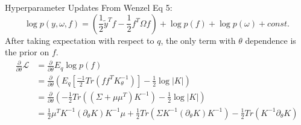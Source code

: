 \documentclass[aspectratio=169,xcolor=dvipsnames]{beamer}
\begin{document}
\begin{frame}{Hyperparameter Updates}
    From Wenzel Eq 5:
    $$ \log p(y, \omega, f) = \left(\frac{1}{2}\tilde{y}^T f - \frac{1}{2} f^T \Omega f\right) + \log p(f) + \log p(\omega) + const.$$
After taking expectation with respect to $q$, the only term with $\theta$ dependence is the prior on $f$. 
\begin{align} 
\frac{\partial}{\partial \theta} \mathcal L &= \frac{\partial}{\partial \theta} E_q \log p(f)  \\
& =\frac{\partial}{\partial \theta} \left(E_q\left[ \frac{-1}{2}Tr(ff^T K_\theta^{-1}) \right] - \frac{1}{2} \log |K|\right)\\
& = \frac{\partial}{\partial \theta}\left(-\frac{1}{2} Tr\left((\Sigma + \mu \mu^T)K^{-1}\right) - \frac{1}{2} \log |K|\right)\\
& = \frac{1}{2} \mu^T K^{-1} (\partial_\theta K) K^{-1} \mu + \frac{1}{2}Tr(\Sigma K^{-1} (\partial_\theta K)K^{-1}) - \frac{1}{2} Tr(K^{-1} \partial_\theta K)
\end{align}

\end{frame}
\end{document}
